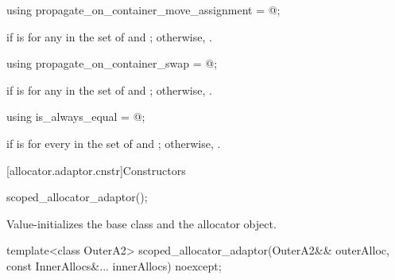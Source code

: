 %
\begin{itemdecl}
using propagate_on_container_move_assignment = @\seebelow@;
\end{itemdecl}

\begin{itemdescr}
\pnum
\ctype {} if
 is
 for any  in the set of  and
; otherwise, .
\end{itemdescr}

%
\begin{itemdecl}
using propagate_on_container_swap = @\seebelow@;
\end{itemdecl}

\begin{itemdescr}
\pnum
\ctype {} if
 is
 for any  in the set of  and
; otherwise, .
\end{itemdescr}

%
\begin{itemdecl}
using is_always_equal = @\seebelow@;
\end{itemdecl}

\begin{itemdescr}
\pnum
\ctype {} if
 is
 for every  in the set of  and
; otherwise, .
\end{itemdescr}

[allocator.adaptor.cnstr]{Constructors}

%
\begin{itemdecl}
scoped_allocator_adaptor();
\end{itemdecl}

\begin{itemdescr}
\pnum
\effects
Value-initializes the  base class and the  allocator
object.
\end{itemdescr}

%
\begin{itemdecl}
template<class OuterA2>
  scoped_allocator_adaptor(OuterA2&& outerAlloc, const InnerAllocs&... innerAllocs) noexcept;
\end{itemdecl}


